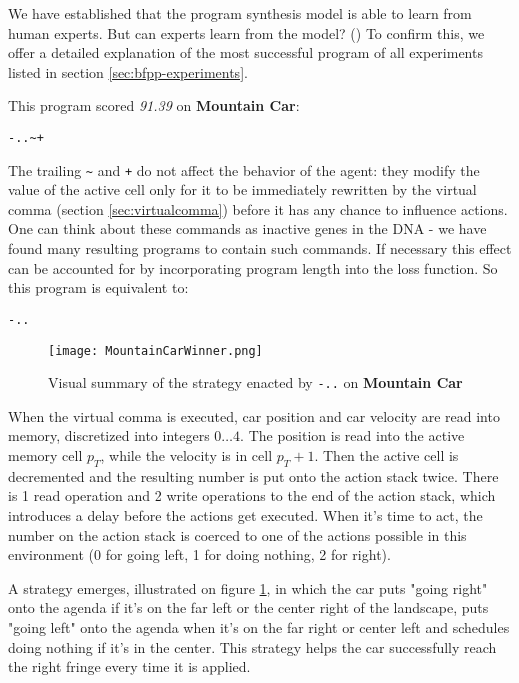 We have established that the program synthesis model is able to learn from human experts.
But can experts learn from the model? (\rqbfppexplainable) 
To confirm this, we offer a detailed explanation of the most successful program of all experiments listed in section \ref{sec:bfpp-experiments}.

This program scored \emph{91.39} on \textbf{Mountain Car}:

\begin{center}
\begin{lstlisting}
-..~+
\end{lstlisting}
\end{center}

The trailing \verb|~| and \verb|+| do not affect the behavior of the agent: they modify the value of the active cell only for it to be immediately rewritten by the virtual comma (section \ref{sec:virtualcomma}) before it has any chance to influence actions.
One can think about these commands as inactive genes in the DNA - we have found many resulting programs to contain such commands.
If necessary this effect can be accounted for by incorporating program length into the loss function.
So this program is equivalent to:

\begin{center}
\begin{lstlisting}
-..
\end{lstlisting}
\end{center}

\begin{figure}
    \centering
    \texttt{[image: MountainCarWinner.png]}
    \caption{Visual summary of the strategy enacted by \texttt{-..} on \textbf{Mountain Car}}
    \label{fig:mountaincarwinner}
\end{figure}

When the virtual comma is executed, car position and car velocity are read into memory, discretized into integers $0\dots4$.
The position is read into the active memory cell $p_T$, while the velocity is in cell $p_T+1$.
Then the active cell is decremented and the resulting number is put onto the action stack twice.
There is 1 read operation and 2 write operations to the end of the action stack, which introduces a delay before the actions get executed.
When it's time to act, the number on the action stack is coerced to one of the actions possible in this environment (0 for going left, 1 for doing nothing, 2 for right). 

A strategy emerges, illustrated on figure \ref{fig:mountaincarwinner}, in which the car puts "going right" onto the agenda if it's on the far left or the center right of the landscape, puts "going left" onto the agenda when it's on the far right or center left and schedules doing nothing if it's in the center.
This strategy helps the car successfully reach the right fringe every time it is applied.

